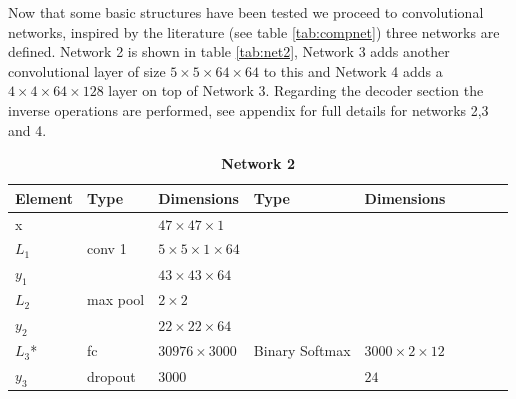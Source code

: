     Now that some basic structures have been tested we proceed to convolutional networks,
    inspired by the literature (see table \ref{tab:compnet}) three networks are defined.
    Network 2 is shown in table \ref{tab:net2}, Network 3
    adds another convolutional layer of size $5\times 5 \times 64 \times 64$ to this and
    Network 4 adds a $4\times 4 \times 64 \times 128$ layer
    on top of Network 3. Regarding the decoder section the inverse operations are
    performed, see appendix \label{appendix1} for full details
    for networks 2,3 and 4.


    \begin{table}[h!] \caption*{\textbf{Network 2}}
    \centering
    {\footnotesize
    \begin{tabular}{|lllllllll|}
    \hline
    \multicolumn{1}{|l|}{Element} & Type     & \multicolumn{1}{l|}{Dimensions}                     & Type     & \multicolumn{1}{l|}{Dimensions}  \\ \hline
    \multicolumn{1}{|l|}{x}       &          & \multicolumn{1}{l|}{$47\times47\times1$}            &          & \multicolumn{1}{l|}{}            \\ \hline
    \multicolumn{1}{|l|}{$L_1$}   & conv 1   & \multicolumn{1}{l|}{$5\times 5\times1\times 64$}    &          & \multicolumn{1}{l|}{}            \\
    \multicolumn{1}{|l|}{$y_1$}   &          & \multicolumn{1}{l|}{$43\times43\times64$}           &          & \multicolumn{1}{l|}{}            \\ \hline
    \multicolumn{1}{|l|}{$L_2$}   & max pool & \multicolumn{1}{l|}{$2\times 2$}                    &          & \multicolumn{1}{l|}{}            \\
    \multicolumn{1}{|l|}{$y_2$}   &          & \multicolumn{1}{l|}{$22\times22\times 64$}          &          & \multicolumn{1}{l|}{}            \\ \hline
    \multicolumn{1}{|l|}{$L_3$*}   & fc       & \multicolumn{1}{l|}{$30976\times3000$}              & Binary
                                                                                                      Softmax & \multicolumn{1}{l|}{$3000\times2\times12$}        \\
    \multicolumn{1}{|l|}{$y_3$}   & dropout  & \multicolumn{1}{l|}{$3000$}                         &          & \multicolumn{1}{l|}{$24$}        \\ \hline

\end{tabular}}
\end{table}
